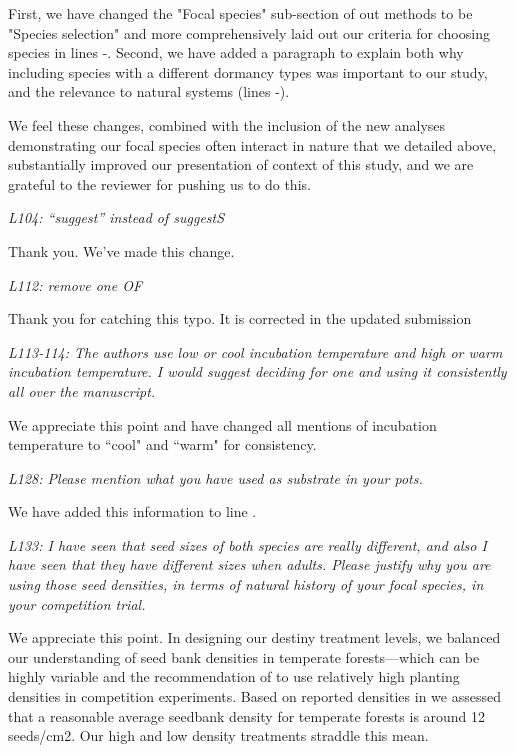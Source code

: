 \documentclass[11pt]{article}
\begin{document}
First, we have changed the "Focal species" sub-section of out methods to be "Species selection" and more comprehensively laid out our criteria for choosing species in lines -. Second, we have added a paragraph to explain both why including species with a different dormancy types was important to our study, and the relevance to natural systems (lines -).

We feel these changes, combined with the inclusion of the new analyses demonstrating our focal species often interact in nature that we detailed above, substantially improved our presentation of context of this study, and we are grateful to the reviewer for pushing us to do this.

\emph{L104: “suggest” instead of suggestS}

Thank you. We've made this change.

\emph{L112: remove one OF}

Thank you for catching this typo. It is corrected in the updated submission

\emph{L113-114: The authors use low or cool incubation temperature and high or warm incubation temperature. I would suggest deciding for one and using it consistently all over the manuscript.}

We appreciate this point and have changed all mentions of incubation temperature to ``cool" and ``warm" for consistency. 

\emph{L128: Please mention what you have used as substrate in your pots.}

We have added this information to line . 

\emph{L133: I have seen that seed sizes of both species are really different, and also I have seen that they have different sizes when adults. Please justify why you are using those seed densities, in terms of natural history of your focal species, in your competition trial.}

We appreciate this point. In designing our destiny treatment levels, we balanced our understanding of seed bank densities in temperate forests---which can be highly variable \citep{Leckie:2000tb,Bossuyt:2002un,Decocq:2004tq} and the recommendation of \citet{Inouye2001} to use relatively high planting densities in competition experiments. Based on reported densities in \citet{Leckie:2000tb,Bossuyt:2002un,Decocq:2004tq} we assessed that a reasonable average seedbank density for temperate forests is around 12 seeds/cm2. Our high and low density treatments straddle this mean.
\end{document}
